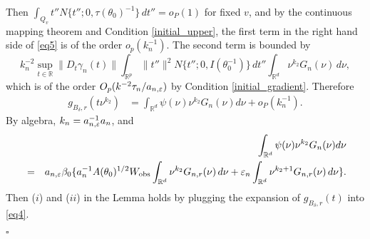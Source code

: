 \documentclass[9pt]{article}
\theoremstyle{remark}
\begin{document}
	Then $\int_{Q_{v}}t''N\{t'';0,\tau(\theta_{0})^{-1}\}\,dt''=o_{P}(1)$
	for fixed $v$, and by the continuous mapping theorem and Condition \ref{initial_upper}, the
	first term in the right hand side of \eqref{eq5} is of the order
	$o_{p}(k_{n}^{-1})$. The second term is bounded by 
	\[
	k_{n}^{-2}\sup_{t\in\mathbb{R}}\|D_{t}\gamma_{n}(t)\|\int_{\mathbb{R}^{p}}\|t''\|^{2}N\{t'';0,I(\theta_{0}^{-1})\}\,dt''\int_{\mathbb{R}^{d}}\nu^{k_{2}}G_{n}(\nu)\,d\nu,
	\]
	which is of the order $O_{p}(k^{-2}\tau_{n}/a_{n,\varepsilon})$ by Condition \ref{initial_gradient}.
	Therefore 
	\begin{align}
	g_{B_{\delta},r}(t\nu^{k_{2}}) & =\int_{\mathbb{R}^{d}}\psi(\nu)\nu^{k_{2}}G_{n}(\nu)d\nu+o_{P}(k_{n}^{-1}).\label{eq6}
	\end{align}
	By algebra, $k_{n}=a_{n,\varepsilon}^{-1}a_{n}$, and 
	\begin{eqnarray}
	&  & \int_{\mathbb{R}^{d}}\psi(\nu)\nu^{k_{2}}G_{n}(\nu)d\nu\nonumber \\
	& = & a_{n,\varepsilon}\beta_{0}\{a_{n}^{-1}A(\theta_{0})^{1/2}W_{\rm obs}\int_{\mathbb{R}^{d}}\nu^{k_{2}}G_{n,r}(\nu)\,d\nu+\varepsilon_{n}\int_{\mathbb{R}^{d}}\nu^{k_{2}+1}G_{n,r}(\nu)\,d\nu\}.\label{eq7}
	\end{eqnarray}
	Then ($i$) and ($ii$) in the Lemma holds by plugging the expansion
	of $g_{B_{\delta},r}(t)$ into \eqref{eq4}.
	
	\hfill{$\square$} 
	
\end{document}
